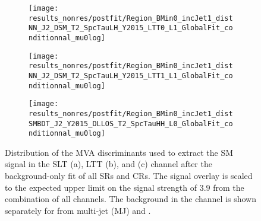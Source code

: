 \begin{figure}[htbp]
  \centering

  \begin{subfigure}{0.495\textwidth}
    \centering

    \texttt{[image: results\_nonres/postfit/Region\_BMin0\_incJet1\_distNN\_J2\_DSM\_T2\_SpcTauLH\_Y2015\_LTT0\_L1\_GlobalFit\_conditionnal\_mu0log]}

  \end{subfigure}\hfill%
  \begin{subfigure}{0.495\textwidth}
    \centering

    \texttt{[image: results\_nonres/postfit/Region\_BMin0\_incJet1\_distNN\_J2\_DSM\_T2\_SpcTauLH\_Y2015\_LTT1\_L1\_GlobalFit\_conditionnal\_mu0log]}

  \end{subfigure}

  \vspace{0.5em}

  \begin{subfigure}{0.495\textwidth}
    \centering

    \texttt{[image: results\_nonres/postfit/Region\_BMin0\_incJet1\_distSMBDT\_J2\_Y2015\_DLLOS\_T2\_SpcTauHH\_L0\_GlobalFit\_conditionnal\_mu0log]}

  \end{subfigure}

  \caption{Distribution of the MVA discriminants used to extract the SM~\HH
    signal in the \lephad SLT (a), \lephad LTT (b), and \hadhad (c) channel
    after the background-only fit of all SRs and CRs. The signal overlay is
    scaled to the expected upper limit on the signal strength of $3.9$ from the
    combination of all channels. The \faketauhadvis background in the \hadhad
    channel is shown separately for \faketauhadvis from multi-jet (MJ) and
    \ttbar.}%
  \label{fig:mvascores_postfit}
\end{figure}

